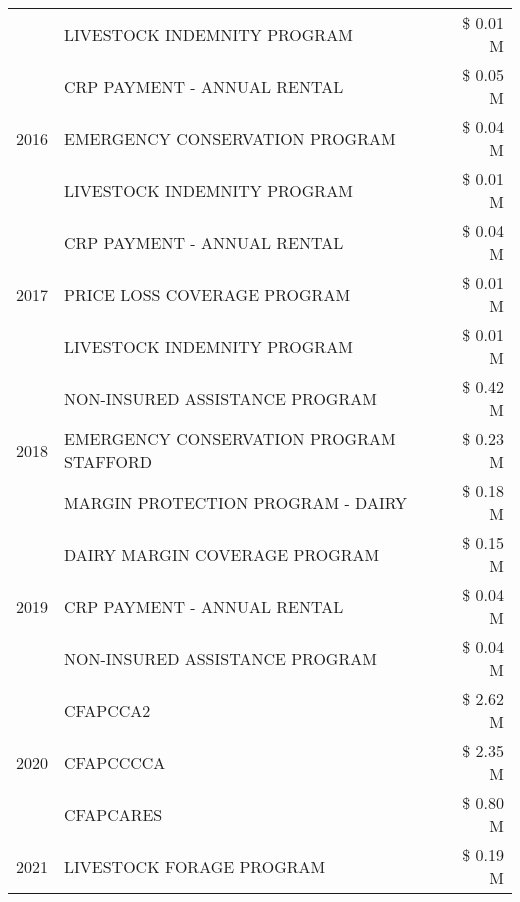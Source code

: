 \begin{tabular}{llr}
 & LIVESTOCK INDEMNITY PROGRAM & \$ 0.01 M \\
\cline{1-3}
\multirow[t]{3}{*}{2016} & CRP PAYMENT - ANNUAL RENTAL & \$ 0.05 M \\
 & EMERGENCY CONSERVATION PROGRAM & \$ 0.04 M \\
 & LIVESTOCK INDEMNITY PROGRAM & \$ 0.01 M \\
\cline{1-3}
\multirow[t]{3}{*}{2017} & CRP PAYMENT - ANNUAL RENTAL & \$ 0.04 M \\
 & PRICE LOSS COVERAGE PROGRAM & \$ 0.01 M \\
 & LIVESTOCK INDEMNITY PROGRAM & \$ 0.01 M \\
\cline{1-3}
\multirow[t]{3}{*}{2018} & NON-INSURED ASSISTANCE PROGRAM & \$ 0.42 M \\
 & EMERGENCY CONSERVATION PROGRAM STAFFORD & \$ 0.23 M \\
 & MARGIN PROTECTION PROGRAM - DAIRY & \$ 0.18 M \\
\cline{1-3}
\multirow[t]{3}{*}{2019} & DAIRY MARGIN COVERAGE PROGRAM & \$ 0.15 M \\
 & CRP PAYMENT - ANNUAL RENTAL & \$ 0.04 M \\
 & NON-INSURED ASSISTANCE PROGRAM & \$ 0.04 M \\
\cline{1-3}
\multirow[t]{3}{*}{2020} & CFAPCCA2 & \$ 2.62 M \\
 & CFAPCCCCA & \$ 2.35 M \\
 & CFAPCARES & \$ 0.80 M \\
\cline{1-3}
2021 & LIVESTOCK FORAGE PROGRAM & \$ 0.19 M \\
\cline{1-3}
\bottomrule
\end{tabular}
